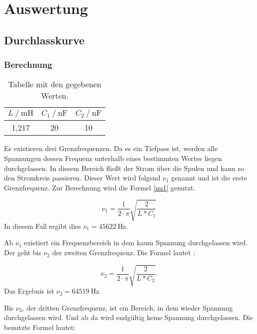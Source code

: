 \section{Auswertung}
\label{sec:Auswertung}

\subsection{Durchlasskurve}

\subsubsection{Berechnung}

\begin{table}
  \centering
  \caption{Tabelle mit den gegebenen Werten.}
  \label{tab:wertedurch}
  \begin{tabular}{c c c}
    \toprule
    $L \ /\ \si{\milli\henry}$ & $C_1 \ /\ \si{\nano\farad}$ & $C_2 \ /\ \si{\nano\farad}$ \\
    \midrule
    1,217 & 20 & 10\\
    \bottomrule
  \end{tabular}
\end{table}

Es existieren drei Grenzfrequenzen. Da es ein Tiefpass ist, werden alle Spannungen
dessen Frequenz unterhalb eines bestimmten Wertes liegen durchgelassen.
In diesem Bereich fließt der Strom über die Spulen und kann so den Stromkreis
passieren. Dieser Wert
wird folgend $\nu_1$ genannt und ist die erste Grenzfrequenz.
Zur Berechnung wird die Formel \eqref{nu1} genutzt.

\begin{equation}
  \nu_1 = \frac{1}{2\cdot\pi}\sqrt{\frac{2}{L*C_1}}
\end{equation}
In diesem Fall ergibt dies $\nu_1 = \SI{45622}{\hertz}$.

Ab $\nu_1$ existiert ein Frequenzbereich in dem kaum Spannung durchgelassen wird.
Der geht bis $\nu_2$ der zweiten Grenzfrequenz. Die Formel lautet :

\begin{equation}
  \nu_2 = \frac{1}{2\cdot\pi}\sqrt{\frac{2}{L*C_2}}.
\end{equation}
Das Ergebnis ist $\nu_2 = \SI{64519}{\hertz}$.

Bis $\nu_3$, der dritten Grenzfrequenz, ist ein Bereich, in dem wieder Spannung
durchgelassen wird. Und ab da wird endgültig keine Spannung durchgelassen. Die
benutzte Formel lautet:

